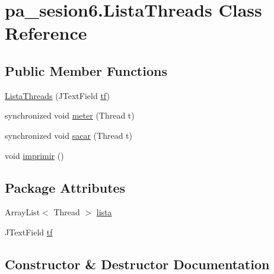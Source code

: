 \hypertarget{classpa__sesion6_1_1_lista_threads}{}\section{pa\+\_\+sesion6.\+Lista\+Threads Class Reference}
\label{classpa__sesion6_1_1_lista_threads}
\subsection*{Public Member Functions}
\begin{DoxyCompactItemize}
\item 
\mbox{\hyperlink{classpa__sesion6_1_1_lista_threads_a7e301d2a3483abb2ffdb55093e0a9e15}{Lista\+Threads}} (J\+Text\+Field \mbox{\hyperlink{classpa__sesion6_1_1_lista_threads_a3fe988c4626e0a9dad9f164b8c6fd426}{tf}})
\item 
synchronized void \mbox{\hyperlink{classpa__sesion6_1_1_lista_threads_a624e853e2ebdf3ccf90692fee902183e}{meter}} (Thread t)
\item 
synchronized void \mbox{\hyperlink{classpa__sesion6_1_1_lista_threads_a750595ae1fea92fc8270776a0aebaa58}{sacar}} (Thread t)
\item 
void \mbox{\hyperlink{classpa__sesion6_1_1_lista_threads_ae469a3e62adee9a81540a7e1c80602bb}{imprimir}} ()
\end{DoxyCompactItemize}
\subsection*{Package Attributes}
\begin{DoxyCompactItemize}
\item 
Array\+List$<$ Thread $>$ \mbox{\hyperlink{classpa__sesion6_1_1_lista_threads_a934ff238b8937623cc1a047bc9860605}{lista}}
\item 
J\+Text\+Field \mbox{\hyperlink{classpa__sesion6_1_1_lista_threads_a3fe988c4626e0a9dad9f164b8c6fd426}{tf}}
\end{DoxyCompactItemize}


\subsection{Constructor \& Destructor Documentation}
\mbox{\label{classpa__sesion6_1_1_lista_threads_a7e301d2a3483abb2ffdb55093e0a9e15}} 
